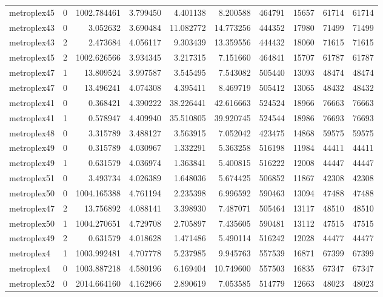 \begin{longtable}{|l|r|r|r|r|r|r|r|r|r|}
metroplex45 & 0 & 1002.784461 & 3.799450 & 4.401138 & 8.200588 & 464791 & 15657 & 61714 & 61714 \\
metroplex43 & 0 & 3.052632 & 3.690484 & 11.082772 & 14.773256 & 444352 & 17980 & 71499 & 71499 \\
metroplex43 & 2 & 2.473684 & 4.056117 & 9.303439 & 13.359556 & 444432 & 18060 & 71615 & 71615 \\
metroplex45 & 2 & 1002.626566 & 3.934345 & 3.217315 & 7.151660 & 464841 & 15707 & 61787 & 61787 \\
metroplex47 & 1 & 13.809524 & 3.997587 & 3.545495 & 7.543082 & 505440 & 13093 & 48474 & 48474 \\
metroplex47 & 0 & 13.496241 & 4.074308 & 4.395411 & 8.469719 & 505412 & 13065 & 48432 & 48432 \\
metroplex41 & 0 & 0.368421 & 4.390222 & 38.226441 & 42.616663 & 524524 & 18966 & 76663 & 76663 \\
metroplex41 & 1 & 0.578947 & 4.409940 & 35.510805 & 39.920745 & 524544 & 18986 & 76693 & 76693 \\
metroplex48 & 0 & 3.315789 & 3.488127 & 3.563915 & 7.052042 & 423475 & 14868 & 59575 & 59575 \\
metroplex49 & 0 & 0.315789 & 4.030967 & 1.332291 & 5.363258 & 516198 & 11984 & 44411 & 44411 \\
metroplex49 & 1 & 0.631579 & 4.036974 & 1.363841 & 5.400815 & 516222 & 12008 & 44447 & 44447 \\
metroplex51 & 0 & 3.493734 & 4.026389 & 1.648036 & 5.674425 & 506852 & 11867 & 42308 & 42308 \\
metroplex50 & 0 & 1004.165388 & 4.761194 & 2.235398 & 6.996592 & 590463 & 13094 & 47488 & 47488 \\
metroplex47 & 2 & 13.756892 & 4.088141 & 3.398930 & 7.487071 & 505464 & 13117 & 48510 & 48510 \\
metroplex50 & 1 & 1004.270651 & 4.729708 & 2.705897 & 7.435605 & 590481 & 13112 & 47515 & 47515 \\
metroplex49 & 2 & 0.631579 & 4.018628 & 1.471486 & 5.490114 & 516242 & 12028 & 44477 & 44477 \\
metroplex4 & 1 & 1003.992481 & 4.707778 & 5.237985 & 9.945763 & 557539 & 16871 & 67399 & 67399 \\
metroplex4 & 0 & 1003.887218 & 4.580196 & 6.169404 & 10.749600 & 557503 & 16835 & 67347 & 67347 \\
metroplex52 & 0 & 2014.664160 & 4.162966 & 2.890619 & 7.053585 & 514779 & 12663 & 48023 & 48023 \\

\end{longtable}
